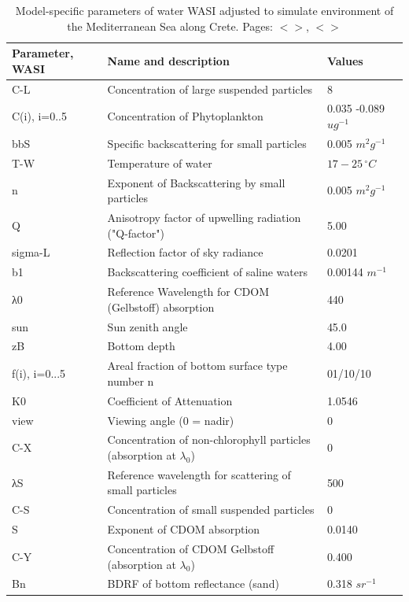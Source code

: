 \documentclass[11pt]{article}
\begin{document}
\begin{table}[H]\footnotesize
	\caption{Model-specific parameters of water WASI adjusted to simulate environment of the Mediterranean Sea along Crete. Pages: $<$\pageref{page-10}$>$, $<$\pageref{page-36}$>$} \label{tab:3}
	\centering
	 \begin{tabular}{|  p{2cm} | p{6cm} | p{25mm} | }
	    \hline
		    \textbf{Parameter, WASI} & \textbf{Name and description} & \textbf{Values} \\ \hline\hline
		    C-L & Concentration of large suspended particles & 8 \\ \hline
		   C(i), i=0..5 & Concentration of Phytoplankton & 0.035 -0.089 $ug^{-1}$ \\ \hline
		    bbS & Specific backscattering for small particles & 0.005 $m^2g^{-1}$ \\ \hline
		   T-W & Temperature of water & $17-25\,^{\circ}C$ \\ \hline
		    n & Exponent of Backscattering by small particles & 0.005 $m^2g^{-1}$ \\ \hline
		    Q &Anisotropy factor of upwelling radiation ("Q-factor") & 5.00 \\ \hline
		    sigma-L & Reflection factor of sky radiance & 0.0201 \\ \hline
		    b1 & Backscattering coefficient of saline waters & 0.00144 $m^{-1}$ \\ \hline
		    λ0 & Reference Wavelength for \ac{CDOM} (Gelbstoff) absorption & 440 \\ \hline
		    sun & Sun zenith angle & 45.0 \\ \hline
		    zB & Bottom depth & 4.00 \\ \hline
		   f(i), i=0...5 & Areal fraction of bottom surface type number n & 01/10/10 \\ \hline
		    K0 & Coefficient of Attenuation & 1.0546 \\ \hline
		   view & Viewing angle (0 = nadir) & 0\\ \hline
		    C-X & Concentration of non-chlorophyll particles (absorption at $\lambda_0$) & 0 \\ \hline
		   λS & Reference wavelength for scattering of small particles & 500 \\ \hline
		    C-S & Concentration of small suspended particles & 0 \\ \hline
		   S & Exponent of \ac{CDOM} absorption & 0.0140 \\ \hline
		    C-Y & Concentration of \ac{CDOM} Gelbstoff (absorption at $\lambda_0$) & 0.400 \\ \hline
		    Bn & BDRF of bottom reflectance (sand) & 0.318 $sr^{-1}$\\
	    \hline
	  \end{tabular}	  
\end{table}
\end{document}
